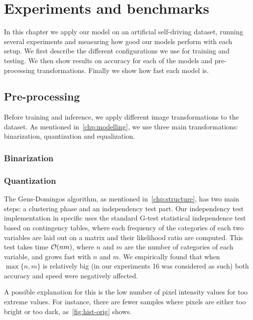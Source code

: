 
\chapter{Experiments and benchmarks}\label{chp:benchmarks}

In this chapter we apply our model on an artificial self-driving dataset, running several
experiments and measuring how good our models perform with each setup. We first describe the
different configurations we use for training and testing. We then show results on accuracy for each
of the models and pre-processing transformations. Finally we show how fast each model is.

\section{Pre-processing}

Before training and inference, we apply different image transformations to the dataset. As
mentioned in~\autoref{chp:modelling}, we use three main transformations: binarization, quantization
and equalization.

\subsection{Binarization}


\subsection{Quantization}

The Gens-Domingos algorithm, as mentioned in~\autoref{chp:structure}, has two main steps: a
clustering phase and an independency test part. Our independency test implementation in specific
uses the standard G-test statistical independence test based on contingency tables, where each
frequency of the categories of each two variables are laid out on a matrix and their likelihood
ratio are computed. This test takes time $\mathcal{O}(n m)$, where $n$ and $m$ are the number of
categories of each variable, and grows fast with $n$ and $m$. We empirically found that when
$\max\{n,m\}$ is relatively big (in our experiments 16 was considered as such) both accuracy and
speed were negatively affected.

A possible explanation for this is the low number of pixel intensity values for too extreme values.
For instance, there are fewer samples where pixels are either too bright or too dark,
as~\autoref{fig:hist-orig} shows.

